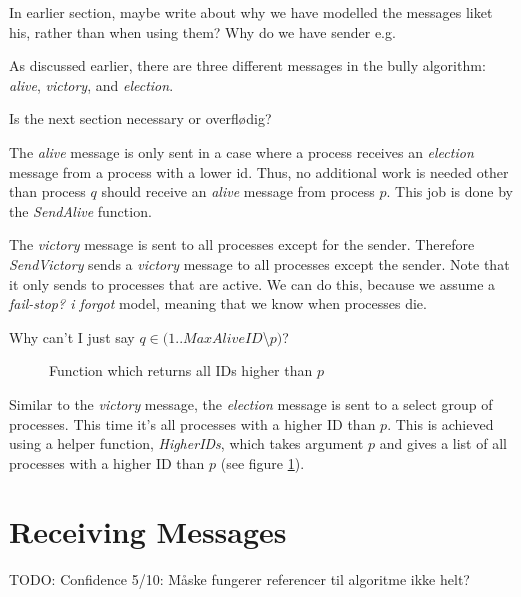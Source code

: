 \documentclass{report}
\begin{document}
\begin{callout}
  In earlier section, maybe write about why we have modelled the messages liket his, rather than when using them? Why do we have sender e.g.
  \end{callout}

  As discussed earlier, there are three different messages in the bully algorithm: \textit{alive}, \textit{victory}, and \textit{election}.

\begin{callout}
Is the next section necessary or overflødig?
\end{callout}

The \textit{alive} message is only sent in a case where a process receives an \textit{election} message from a process with a lower id. Thus, no additional work is needed other than process $q$ should receive an \textit{alive} message from process $p$. This job is done by the \textit{SendAlive} function.

The \textit{victory} message is sent to all processes except for the sender. Therefore \textit{SendVictory} sends a \textit{victory} message to all processes except the sender. Note that it only sends to processes that are active. We can do this, because we assume a \textit{fail-stop? i forgot} model, meaning that we know when processes die.
\begin{callout}
Why can't I just say $q \in (1..MaxAliveID $\textbackslash$ p)$?
\end{callout}

\begin{figure}
  \tlatex

\@x{}\moduleLeftDash{}\moduleRightDash\@xx{}%
\fl{}\bottombar\cl{}
\label{higherids}
  \caption{Function which returns all IDs higher than $p$}
\end{figure}

  Similar to the \textit{victory} message, the \textit{election} message is sent to a select group of processes. This time it's all processes with a higher ID than $p$. This is achieved using a helper function, \textit{HigherIDs}, which takes argument $p$ and gives a list of all processes with a higher ID than $p$ (see figure \ref{higherids}).

\section{Receiving Messages}
\begin{callout}
TODO: Confidence 5/10: Måske fungerer referencer til algoritme ikke helt?
\end{callout}
\end{document}
